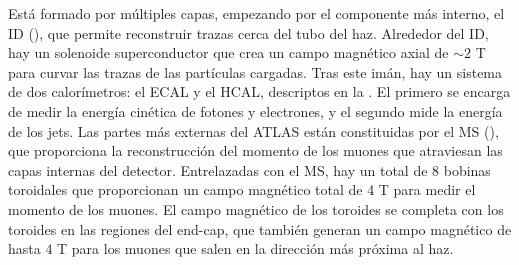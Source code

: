 Está formado por múltiples capas, empezando por el componente más interno, el \acf{ID} (\Sect{\ref{subsec:atlas:atlas:id}}), que permite reconstruir trazas cerca del tubo del haz. Alrededor del \ac{ID}, hay un solenoide superconductor que crea un campo magnético axial de \(\sim 2\) T para curvar las trazas de las partículas cargadas.
Tras este imán, hay un sistema de dos calorímetros: el \acf{ECAL} y el \acf{HCAL}, descriptos en la \Sect{\ref{subsec:atlas:atlas:cals}}. El primero se encarga de medir la energía cinética de fotones y electrones, y el segundo mide la energía de los jets.
Las partes más externas del \ac{ATLAS} están constituidas por el \acf{MS} (\Sect{\ref{subsec:atlas:atlas:ms}}), que proporciona la reconstrucción del momento de los muones que atraviesan las capas internas del detector. Entrelazadas con el \ac{MS}, hay un total de 8 bobinas toroidales que proporcionan un campo magnético total de 4 T para medir el momento de los muones. El campo magnético de los toroides se completa con los toroides en las regiones del end-cap, que también generan un campo magnético de hasta 4 T para los muones que salen en la dirección más próxima al haz.





